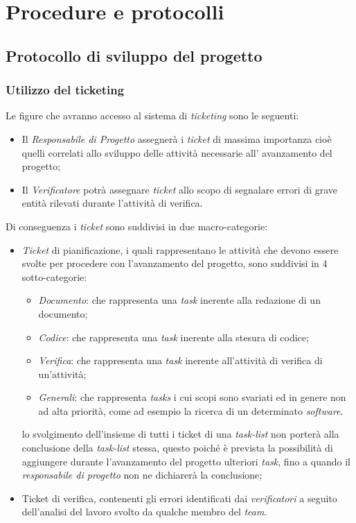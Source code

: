 \section{Procedure e protocolli}
\subsection{Protocollo di sviluppo del progetto}
\subsubsection{Utilizzo del ticketing}
Le figure che avranno accesso al sistema di \textit{ticketing} sono le seguenti:

\begin{itemize}
\item Il \textit{Responsabile di Progetto} assegnerà i \textit{ticket} di massima importanza cioè quelli correlati allo sviluppo delle attività necessarie all' avanzamento del progetto;
\item Il \textit{Verificatore} potrà assegnare \textit{ticket} allo scopo di segnalare errori di grave entità rilevati durante l'attività di verifica.
\end{itemize}

Di conseguenza i \textit{ticket} sono suddivisi in due macro-categorie:
\begin{itemize}
\item \textit{Ticket} di pianificazione, i quali rappresentano le attività che devono essere svolte per procedere con l'avanzamento del progetto, sono suddivisi in 4 sotto-categorie:
\begin{itemize}
\item \emph{Documento}: che rappresenta una \textit{task} inerente alla redazione di un documento; 
\item \emph{Codice}: che rappresenta una \textit{task} inerente alla stesura di codice;
\item \emph{Verifica}: che rappresenta una \textit{task} inerente all'attività di verifica di un'attività;
\item \emph{Generali}: che rappresenta \textit{tasks} i cui scopi sono svariati ed in genere non ad alta priorità, come ad esempio la ricerca di un determinato \textit{software}.
\end{itemize}
lo svolgimento dell'insieme di tutti i ticket di una \textit{task-list} non porterà alla conclusione della \textit{task-list} stessa, questo poiché è prevista la possibilità di aggiungere durante l'avanzamento del progetto ulteriori \textit{task}, fino a quando il \textit{responsabile di progetto} non ne dichiarerà la conclusione;
\item Ticket di verifica, contenenti gli errori identificati dai \textit{verificatori} a seguito dell'analisi del lavoro svolto da qualche membro del \textit{team}.
\end{itemize}

